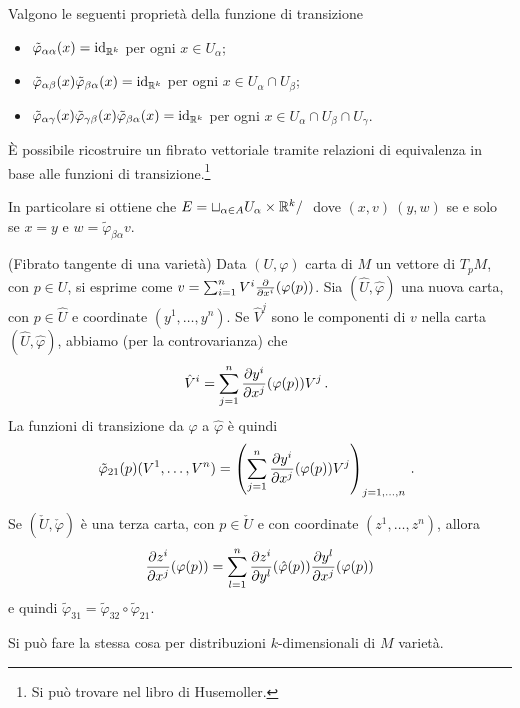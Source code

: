 \begin{proposition}
	Valgono le seguenti proprietà della funzione di transizione
	\begin{itemize}
	 \item $\tilde\varphi_{\alpha\alpha}(x)=\mathrm{id}_{\mathbb R^k}$ per ogni $x\in U_\alpha$;
	 \item $\tilde\varphi_{\alpha\beta}(x)\tilde\varphi_{\beta\alpha}(x) = \mathrm{id}_{\mathbb R^k}$ per ogni $x\in U_\alpha\cap U_\beta$;
	 \item $\tilde\varphi_{\alpha\gamma}(x) \tilde\varphi_{\gamma\beta}(x) \tilde\varphi_{\beta\alpha}(x) = \mathrm{id}_{\mathbb R^k}$ per ogni $x\in U_\alpha\cap U_\beta \cap U_\gamma$.
	\end{itemize}
\end{proposition}

\begin{remark}
	È possibile ricostruire un fibrato vettoriale tramite relazioni di equivalenza in base alle funzioni di transizione.\footnote{Si può trovare nel libro di Husemoller.}
	
	In particolare si ottiene che $E = \sqcup_{\alpha\in A} U_\alpha \times \mathbb R^k / ~$ dove $(x,v)~(y,w)$ se e solo se $x=y$ e $w = \tilde\varphi_{\beta\alpha}v$.
\end{remark}

\begin{example}
	(Fibrato tangente di una varietà) Data $(U,\varphi)$ carta di $M$ un vettore di $T_pM$, con $p\in U$, si esprime come $v = \sum_{i=1}^n V^i\frac{\partial }{\partial x^i}(\varphi(p))$. Sia $(\hat U, \hat \varphi)$ una nuova carta, con $p\in \hat U$ e coordinate $(y^1,\dots, y^n)$.
	 Se $\hat V^j$ sono le componenti di $v$ nella carta $(\hat U,\hat \varphi)$, abbiamo (per la controvarianza) che
	 \begin{equation*}
	 	\hat V^i = \sum_{j=1}^n \frac{\partial y^i}{\partial x^j}(\varphi(p))V^j\, \text{. }
	 \end{equation*}
	 La funzioni di transizione da $\varphi$ a $\hat \varphi$ è quindi
	 \begin{equation*}
	 \tilde\varphi_{21}(p)(V^1,\dots,V^n) = \left(\sum_{j=1}^n \frac{\partial y^i}{\partial x^j}(\varphi(p))V^j\right)_{j=1,\dots,n}\, \text{. }
	 \end{equation*}
	 
	 Se $(\check U, \check \varphi)$ è una terza carta, con $p\in \check U$ e con coordinate $(z^1,\dots,z^n)$, allora
	 \begin{equation*}
	 	\frac{\partial z^i}{\partial x^j}(\varphi(p)) = \sum_{l=1}^n \frac{\partial z^i}{\partial y^l}(\hat\varphi(p)) \frac{\partial y^l}{\partial x^j}(\varphi(p))  
	 \end{equation*}
	e quindi $\tilde\varphi_{31}=\tilde\varphi_{32}\circ \tilde\varphi_{21}$.
	
	Si può fare la stessa cosa per distribuzioni $k$-dimensionali di $M$ varietà.
	
\end{example}

